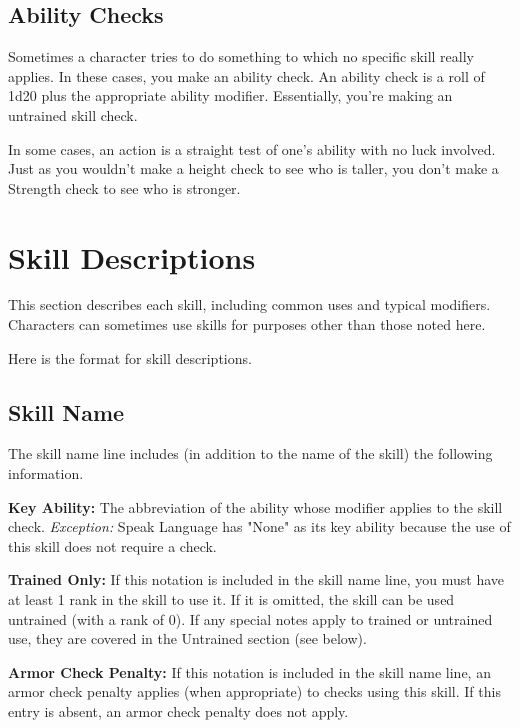 \subsection{Ability Checks}

Sometimes a character tries to do something to which no specific skill really applies. 
In these cases, you make an ability check. An ability check is a roll of 1d20 plus 
the appropriate ability modifier. Essentially, you're making an untrained skill 
check. 

In some cases, an action is a straight test of one's ability with no luck involved. 
Just as you wouldn't make a height check to see who is taller, you don't make a 
Strength check to see who is stronger.

\section{Skill Descriptions}

This section describes each skill, including common uses and typical modifiers. 
Characters can sometimes use skills for purposes other than those noted here.

Here is the format for skill descriptions.

\subsection{Skill Name}

The skill name line includes (in addition to the name of the skill) the following 
information.

\textbf{Key Ability:} The abbreviation of the ability whose modifier applies to 
the skill check. \textit{Exception:} Speak Language has "None" as its key ability 
because the use of this skill does not require a check.

\textbf{Trained Only:} If this notation is included in the skill name line, you 
must have at least 1 rank in the skill to use it. If it is omitted, the skill can 
be used untrained (with a rank of 0). If any special notes apply to trained or 
untrained use, they are covered in the Untrained section (see below).

\textbf{Armor Check Penalty:} If this notation is included in the skill name line, 
an armor check penalty applies (when appropriate) to checks using this skill. If 
this entry is absent, an armor check penalty does not apply.

